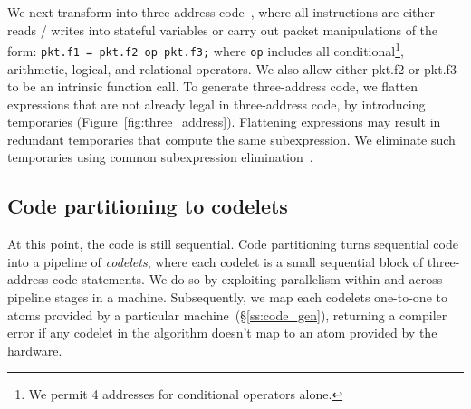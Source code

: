We next transform into three-address code~\cite{tac}, where all instructions
are either reads / writes into stateful variables or carry out packet
manipulations of the form: \texttt{pkt.f1 = pkt.f2 op pkt.f3;} where
\texttt{op} includes all conditional\footnote{We permit 4 addresses for
conditional operators alone.}, arithmetic, logical, and relational operators.
We also allow either pkt.f2 or pkt.f3 to be an intrinsic function call. To
generate three-address code, we flatten expressions that are not already legal
in three-address code, by introducing temporaries
(Figure~\ref{fig:three_address}).  Flattening expressions may result in
redundant temporaries that compute the same subexpression.  We eliminate such
temporaries using common subexpression elimination~\cite{cse}.

\subsection{Code partitioning to codelets}
\label{ss:partitioning}
At this point, the code is still sequential. Code partitioning turns sequential
code into a pipeline of \textit{codelets}, where each codelet is a small
sequential block of three-address code statements. We do so by exploiting
parallelism within and across pipeline stages in a \absmachine machine.
Subsequently, we map each codelets one-to-one to atoms provided by a particular
\absmachine machine~(\S\ref{ss:code_gen}), returning a compiler error if any
codelet in the algorithm doesn't map to an atom provided by the hardware.

